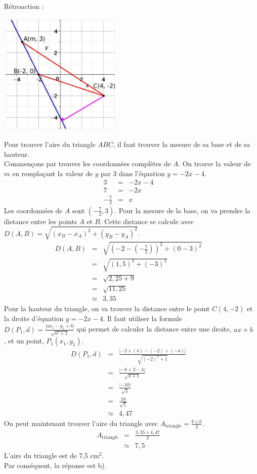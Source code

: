 \documentclass[letterpaper, 12pt]{article}
\begin{document}
R\'etroaction :\\
\begin{center}
 \includegraphics[width=6cm,bb=14 14 415 415]{Q2481r.eps}
\end{center}
Pour trouver l'aire du triangle $ABC$, il faut trouver la mesure de sa base et de sa hauteur. \\
Commen\c cons par trouver les coordonn\'ees compl\`etes de $A$. On trouve la valeur de $m$ en rempla\c cant la valeur de $y$ par 3 dans l'\'equation $y=-2x-4$.
\begin{eqnarray*}
 3&=&-2x-4\\
 7&=&-2x\\[2mm]
 -\frac{7}{2}&=&x
\end{eqnarray*}
 Les coordonn\'ees de $A$ sont $(-\frac{7}{2}, 3)$. Pour la mesure de la base, on va prendre la distance entre les points $A$ et $B$. Cette distance se calcule avec $D(A, B)=\sqrt{(x_{B}-x_{A})^{2}+(y_{B}-y_{A})^{2}}$.
\begin{eqnarray*}
 D(A, B)&=&\sqrt{(-2-(-\frac{7}{2}))^{2}+(0-3)^{2}}\\
&=&\sqrt{(1,5)^{2}+(-3)^{2}}\\
&=&\sqrt{2,25+9}\\
&=&\sqrt{11,25}\\
&\approx&3,35
\end{eqnarray*}
Pour la hauteur du triangle, on va trouver la distance entre le point $C(4, -2)$ et la droite d'\'equation $y=-2x-4$. Il faut utiliser la formule $D(P_{1}, d)=\frac{|ax_{1}-y_{1}+b|}{\sqrt{a^{2}+1}}$ qui permet de calculer la distance entre une droite, $ax+b$, et un point, $P_{1}(x_{1}, y_{1})$.
\begin{eqnarray*}
 D(P_{1}, d)&=&\frac{|-2\times(4)-(-2)+(-4) |}{\sqrt{(-2)^{2}+1}}\\[2mm]
&=&\frac{|-8+2-4|}{\sqrt{4+1}}\\[2mm]
&=&\frac{|-10|}{\sqrt{5}}\\[2mm]
&=&\frac{10}{\sqrt{5}}\\[2mm]
&\approx&4,47
\end{eqnarray*}
On peut maintenant trouver l'aire du triangle avec $A_{\textrm{triangle}}=\frac{b\times h}{2}$.
\begin{eqnarray*}
 A_{\textrm{triangle}}&=&\frac{3,35 \times 4,47}{2}\\[2mm]
&\approx&7,5
\end{eqnarray*}
L'aire du triangle est de 7,5 cm$^{2}$.\\
Par cons\'equent, la r\'eponse est b).\\
\end{document}
